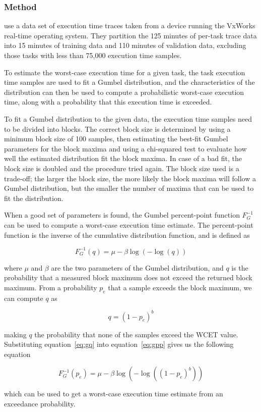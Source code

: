 \subsubsection{Method}

\citeauthor*{hansen_et_al:wcet} use a data set of execution time traces taken from a device running the VxWorks real-time operating system. They partition the 125 minutes of per-task trace data into 15 minutes of training data and 110 minutes of validation data, excluding those tasks with less than 75,000 execution time samples.

To estimate the worst-case execution time for a given task, the task execution time samples are used to fit a Gumbel distribution, and the characteristics of the distribution can then be used to compute a probabilistic worst-case execution time, along with a probability that this execution time is exceeded.

To fit a Gumbel distribution to the given data, the execution time samples need to be divided into blocks. The correct block size is determined by using a minimum block size of 100 samples, then estimating the best-fit Gumbel parameters for the block maxima and using a chi-squared test to evaluate how well the estimated distribution fit the block maxima. In case of a bad fit, the block size is doubled and the procedure tried again. The block size used is a trade-off; the larger the block size, the more likely the block maxima will follow a Gumbel distribution, but the smaller the number of maxima that can be used to fit the distribution.

When a good set of parameters is found, the Gumbel percent-point function $F_G^{-1}$ can be used to compute a worst-case execution time estimate. The percent-point function is the inverse of the cumulative distribution function, and is defined as

\begin{equation}\label{eq:gpp}
    F_G^{-1}(q) = \mu - \beta \log(-\log (q))   
\end{equation}

\noindent where $\mu$ and $\beta$ are the two parameters of the Gumbel distribution, and $q$ is the probability that a measured block maximum does not exceed the returned block maximum. From a probability $p_e$ that a sample exceeds the block maximum, we can compute $q$ as

\begin{equation}\label{eq:gq}
    q = (1 - p_e)^b 
\end{equation}

\noindent making $q$ the probability that none of the samples exceed the WCET value. Substituting equation~\ref{eq:gq} into equation~\ref{eq:gpp} gives us the following equation

\begin{equation}
    F_G^{-1}(p_e) = \mu - \beta \log(-\log ((1 - p_e)^b))
\end{equation}

\noindent which can be used to get a worst-case execution time estimate from an exceedance probability.

